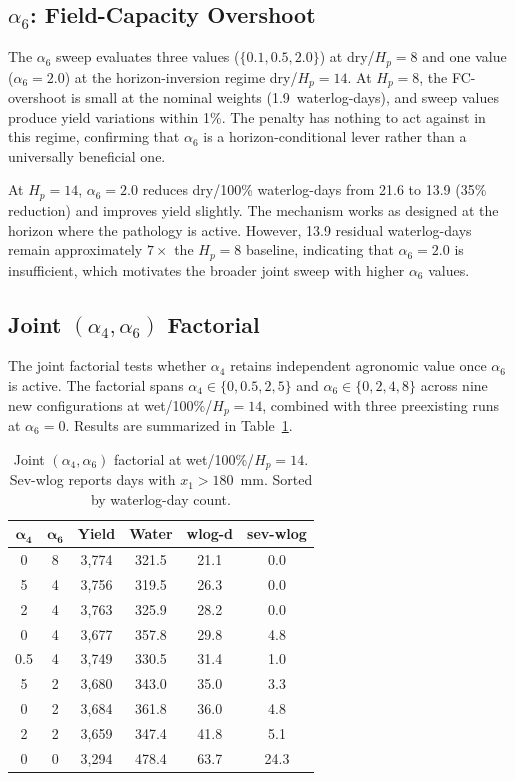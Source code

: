 \subsection{\texorpdfstring{$\alpha_6$: Field-Capacity Overshoot}{Alpha6: FC Overshoot}}
\label{ssec:ctrl-sweep-a6}

The $\alpha_6$ sweep evaluates three values ($\{0.1, 0.5, 2.0\}$) at
dry/$H_p = 8$ and one value ($\alpha_6 = 2.0$) at the horizon-inversion
regime dry/$H_p = 14$. At $H_p = 8$, the FC-overshoot is small at the
nominal weights (1.9~waterlog-days), and sweep values produce yield
variations within 1\%. The penalty has nothing to act against in this regime,
confirming that $\alpha_6$ is a horizon-conditional lever rather than a
universally beneficial one.

At $H_p = 14$, $\alpha_6 = 2.0$ reduces dry/100\% waterlog-days from 21.6
to 13.9 (35\% reduction) and improves yield slightly. The mechanism works as
designed at the horizon where the pathology is active. However, 13.9
residual waterlog-days remain approximately $7\times$ the $H_p = 8$ baseline,
indicating that $\alpha_6 = 2.0$ is insufficient, which motivates the broader
joint sweep with higher $\alpha_6$ values.

\subsection{\texorpdfstring{Joint $(\alpha_4, \alpha_6)$ Factorial}{Joint Alpha4 Alpha6 Factorial}}
\label{ssec:ctrl-sweep-joint}

The joint factorial tests whether $\alpha_4$ retains independent agronomic
value once $\alpha_6$ is active. The factorial spans $\alpha_4 \in \{0, 0.5,
2, 5\}$ and $\alpha_6 \in \{0, 2, 4, 8\}$ across nine new configurations at
wet/100\%/$H_p=14$, combined with three preexisting runs at $\alpha_6 = 0$.
Results are summarized in Table~\ref{tab:sweep-joint}.

\begin{table}[h]
\centering
\caption{Joint $(\alpha_4, \alpha_6)$ factorial at wet/100\%/$H_p=14$.
Sev-wlog reports days with $x_1 > 180$~mm. Sorted by waterlog-day count.}
\label{tab:sweep-joint}
\begin{tabular}{cccccc}
\toprule
$\boldsymbol{\alpha_4}$ & $\boldsymbol{\alpha_6}$
  & \textbf{Yield} & \textbf{Water} & \textbf{wlog-d} & \textbf{sev-wlog} \\
\midrule
0   & 8 & 3{,}774 & 321.5 & 21.1 & 0.0 \\
5   & 4 & 3{,}756 & 319.5 & 26.3 & 0.0 \\
2   & 4 & 3{,}763 & 325.9 & 28.2 & 0.0 \\
0   & 4 & 3{,}677 & 357.8 & 29.8 & 4.8 \\
0.5 & 4 & 3{,}749 & 330.5 & 31.4 & 1.0 \\
5   & 2 & 3{,}680 & 343.0 & 35.0 & 3.3 \\
0   & 2 & 3{,}684 & 361.8 & 36.0 & 4.8 \\
2   & 2 & 3{,}659 & 347.4 & 41.8 & 5.1 \\
0   & 0 & 3{,}294 & 478.4 & 63.7 & 24.3 \\
\bottomrule
\end{tabular}
\end{table}

